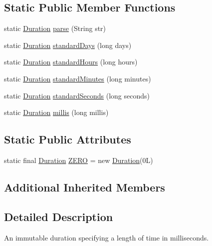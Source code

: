 \subsection*{Static Public Member Functions}
\begin{DoxyCompactItemize}
\item 
static \hyperlink{classorg_1_1joda_1_1time_1_1_duration}{Duration} \hyperlink{classorg_1_1joda_1_1time_1_1_duration_a72a34230c46187dc93795e3706b9a51a}{parse} (String str)
\item 
static \hyperlink{classorg_1_1joda_1_1time_1_1_duration}{Duration} \hyperlink{classorg_1_1joda_1_1time_1_1_duration_ae66e9f43cfadc550508217d8007466e3}{standard\-Days} (long days)
\item 
static \hyperlink{classorg_1_1joda_1_1time_1_1_duration}{Duration} \hyperlink{classorg_1_1joda_1_1time_1_1_duration_a09b10740bf781d5d39704bb8fd14dbe1}{standard\-Hours} (long hours)
\item 
static \hyperlink{classorg_1_1joda_1_1time_1_1_duration}{Duration} \hyperlink{classorg_1_1joda_1_1time_1_1_duration_aea5cc0c940261c15fdbd37d399e1a6cc}{standard\-Minutes} (long minutes)
\item 
static \hyperlink{classorg_1_1joda_1_1time_1_1_duration}{Duration} \hyperlink{classorg_1_1joda_1_1time_1_1_duration_a62da0f0be5a591f7045e0d351563e4f7}{standard\-Seconds} (long seconds)
\item 
static \hyperlink{classorg_1_1joda_1_1time_1_1_duration}{Duration} \hyperlink{classorg_1_1joda_1_1time_1_1_duration_a773e2c37b938d9957634254a38cdd9cc}{millis} (long millis)
\end{DoxyCompactItemize}
\subsection*{Static Public Attributes}
\begin{DoxyCompactItemize}
\item 
static final \hyperlink{classorg_1_1joda_1_1time_1_1_duration}{Duration} \hyperlink{classorg_1_1joda_1_1time_1_1_duration_af02ff2b362e549aa029cafdd89394a53}{Z\-E\-R\-O} = new \hyperlink{classorg_1_1joda_1_1time_1_1_duration}{Duration}(0\-L)
\end{DoxyCompactItemize}
\subsection*{Additional Inherited Members}


\subsection{Detailed Description}
An immutable duration specifying a length of time in milliseconds. 

